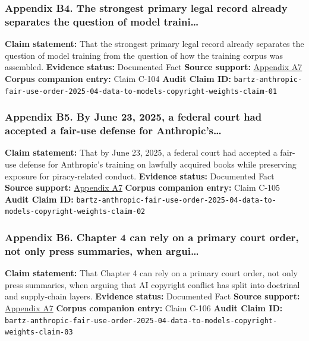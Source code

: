 \documentclass[
  american,
  11pt,
  letterpaper,
]{article}
\begin{document}
\subsubsection{Appendix B4. The strongest primary legal record already
separates the question of model
traini\ldots{}}\label{ch-04-appendix-b4-the-strongest-primary-legal-record-already-separates-the-question-of-model-traini}

\textbf{Claim statement:} That the strongest primary legal record
already separates the question of model training from the question of
how the training corpus was assembled. \textbf{Evidence status:}
Documented Fact \textbf{Source support:}
\hyperref[ch-04-appendix-a7-bartz-et-al-v-anthropic-pbc-order-on-fair-use]{Appendix
A7} \textbf{Corpus companion entry:} Claim C-104 \textbf{Audit Claim
ID:}
\texttt{bartz-anthropic-fair-use-order-2025-04-data-to-models-copyright-weights-claim-01}

\subsubsection{Appendix B5. By June 23, 2025, a federal court had
accepted a fair-use defense for
Anthropic's\ldots{}}\label{ch-04-appendix-b5-by-june-23-2025-a-federal-court-had-accepted-a-fair-use-defense-for-anthropic-s}

\textbf{Claim statement:} That by June 23, 2025, a federal court had
accepted a fair-use defense for Anthropic's training on lawfully
acquired books while preserving exposure for piracy-related conduct.
\textbf{Evidence status:} Documented Fact \textbf{Source support:}
\hyperref[ch-04-appendix-a7-bartz-et-al-v-anthropic-pbc-order-on-fair-use]{Appendix
A7} \textbf{Corpus companion entry:} Claim C-105 \textbf{Audit Claim
ID:}
\texttt{bartz-anthropic-fair-use-order-2025-04-data-to-models-copyright-weights-claim-02}

\subsubsection{Appendix B6. Chapter 4 can rely on a primary court order,
not only press summaries, when
argui\ldots{}}\label{ch-04-appendix-b6-chapter-4-can-rely-on-a-primary-court-order-not-only-press-summaries-when-argui}

\textbf{Claim statement:} That Chapter 4 can rely on a primary court
order, not only press summaries, when arguing that AI copyright conflict
has split into doctrinal and supply-chain layers. \textbf{Evidence
status:} Documented Fact \textbf{Source support:}
\hyperref[ch-04-appendix-a7-bartz-et-al-v-anthropic-pbc-order-on-fair-use]{Appendix
A7} \textbf{Corpus companion entry:} Claim C-106 \textbf{Audit Claim
ID:}
\texttt{bartz-anthropic-fair-use-order-2025-04-data-to-models-copyright-weights-claim-03}
\end{document}
